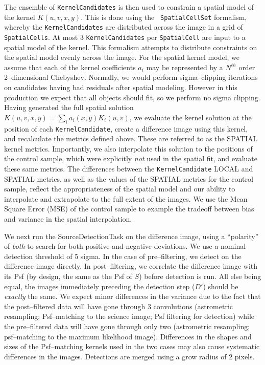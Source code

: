 \documentclass[prd, nofootinbib, floatfix, 11pt,tightenlines,times]{article}
\begin{document}
The ensemble of {\tt KernelCandidates} is then used to constrain a
spatial model of the kernel $K(u,v,x,y)$.  This is done using the {\tt
  SpatialCellSet} formalism, whereby the {\tt KernelCandidates} are
distributed across the image in a grid of {\tt SpatialCells}.  At most
3 {\tt KernelCandidates} per {\tt SpatialCell} are input to a spatial
model of the kernel.  This formalism attempts to distribute
constraints on the spatial model evenly across the image.  For the
spatial kernel model, we assume that each of the kernel coefficients
$a_i$ may be represented by a $N^{th}$ order 2--dimensional Chebyshev.
Normally, we would perform sigma--clipping iterations on candidates
having bad residuals after spatial modeling.  However in this
production we expect that all objects should fit, so we perform no
sigma clipping.  Having generated the full spatial solution
$K(u,v,x,y) = \sum_i a_i(x,y) K_i(u,v)$, we evaluate the kernel
solution at the position of each {\tt KernelCandidate}, create a
difference image using this kernel, and recalculate the metrics
defined above.  These are referred to as the SPATIAL kernel metrics.
Importantly, we also interpolate this solution to the positions of the
control sample, which were explicitly {\it not} used in the spatial
fit, and evaluate these same metrics.  The differences between the
{\tt KernelCandidate} LOCAL and SPATIAL metrics, as well as the values
of the SPATIAL metrics for the control sample, reflect the
appropriateness of the spatial model and our ability to interpolate
and extrapolate to the full extent of the images.  We use the Mean
Square Error (MSE) of the control sample to example the tradeoff
between bias and variance in the spatial interpolation.

We next run the SourceDetectionTask on the difference image, using a
``polarity'' of {\it both} to search for both positive and negative
deviations.  We use a nominal detection threshold of 5 sigma.  In the
case of pre--filtering, we detect on the difference image directly.
In post--filtering, we correlate the difference image with its Psf (by
design, the same as the Psf of $S$) before detection is run.  All else
being equal, the images immediately preceding the detection step
($D'$) should be {\it exactly} the same.  We expect minor differences
in the variance due to the fact that the post--filtered data will have
gone through 3 convolutions (astrometric resampling; Psf--matching to
the science image; Psf filtering for detection) while the
pre--filtered data will have gone through only two (astrometric
resampling; psf--matching to the maximum likelihood image).
Differences in the shapes and sizes of the Psf--matching kernels used
in the two cases may also cause systematic differences in the images.
Detections are merged using a grow radius of 2 pixels.
\end{document}

